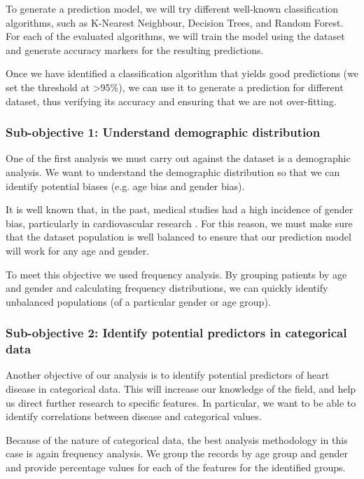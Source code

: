 To generate a prediction model, we will try different well-known classification algorithms, such as K-Nearest Neighbour, 
Decision Trees, and Random Forest. For each of the evaluated algorithms, we will train the model using the dataset and
generate accuracy markers for the resulting predictions.

Once we have identified a classification algorithm that yields good predictions (we set the threshold at >95\%), we can
use it to generate a prediction for different dataset, thus verifying its accuracy and ensuring that we are not over-fitting.

\subsubsection{Sub-objective 1: Understand demographic distribution}

One of the first analysis we must carry out against the dataset is a demographic analysis. We want to understand
the demographic distribution so that we can identify potential biases (e.g. age bias and gender bias).

It is well known that, in the past, medical studies had a high incidence of gender bias, particularly in cardiovascular
research \cite{GenderBiasCardiovascularResearch}. For this reason, we must make sure that the dataset population
is well balanced to ensure that our prediction model will work for any age and gender.

To meet this objective we used frequency analysis. By grouping patients by age and gender and calculating frequency
distributions, we can quickly identify unbalanced populations (of a particular gender or age group).

\subsubsection{Sub-objective 2: Identify potential predictors in categorical data}

Another objective of our analysis is to identify potential predictors of heart disease in categorical data. This will
increase our knowledge of the field, and help us direct further research to specific features. In particular, we want
to be able to identify correlations between disease and categorical values.

Because of the nature of categorical data, the best analysis methodology in this case is again frequency analysis.
We group the records by age group and gender and provide percentage values for each of the features for the
identified groups.

